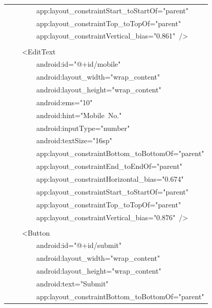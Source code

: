 \documentclass[a4paper,12pt]{article}
\begin{document}
\begin{longtable}{|p{}|}
{\ttfamily\small \ \ \ \ \ \ \ \ app:layout\_constraintStart\_toStartOf="parent"} \\
{\ttfamily\small \ \ \ \ \ \ \ \ app:layout\_constraintTop\_toTopOf="parent"} \\
{\ttfamily\small \ \ \ \ \ \ \ \ app:layout\_constraintVertical\_bias="0.861"\ /\textgreater{}} \\
\strut \\
{\ttfamily\small \ \ \ \ \textless{}EditText} \\
{\ttfamily\small \ \ \ \ \ \ \ \ android:id="@+id/mobile"} \\
{\ttfamily\small \ \ \ \ \ \ \ \ android:layout\_width="wrap\_content"} \\
{\ttfamily\small \ \ \ \ \ \ \ \ android:layout\_height="wrap\_content"} \\
{\ttfamily\small \ \ \ \ \ \ \ \ android:ems="10"} \\
{\ttfamily\small \ \ \ \ \ \ \ \ android:hint="Mobile\ No."} \\
{\ttfamily\small \ \ \ \ \ \ \ \ android:inputType="number"} \\
{\ttfamily\small \ \ \ \ \ \ \ \ android:textSize="16sp"} \\
{\ttfamily\small \ \ \ \ \ \ \ \ app:layout\_constraintBottom\_toBottomOf="parent"} \\
{\ttfamily\small \ \ \ \ \ \ \ \ app:layout\_constraintEnd\_toEndOf="parent"} \\
{\ttfamily\small \ \ \ \ \ \ \ \ app:layout\_constraintHorizontal\_bias="0.674"} \\
{\ttfamily\small \ \ \ \ \ \ \ \ app:layout\_constraintStart\_toStartOf="parent"} \\
{\ttfamily\small \ \ \ \ \ \ \ \ app:layout\_constraintTop\_toTopOf="parent"} \\
{\ttfamily\small \ \ \ \ \ \ \ \ app:layout\_constraintVertical\_bias="0.876"\ /\textgreater{}} \\
\strut \\
{\ttfamily\small \ \ \ \ \textless{}Button} \\
{\ttfamily\small \ \ \ \ \ \ \ \ android:id="@+id/submit"} \\
{\ttfamily\small \ \ \ \ \ \ \ \ android:layout\_width="wrap\_content"} \\
{\ttfamily\small \ \ \ \ \ \ \ \ android:layout\_height="wrap\_content"} \\
{\ttfamily\small \ \ \ \ \ \ \ \ android:text="Submit"} \\
{\ttfamily\small \ \ \ \ \ \ \ \ app:layout\_constraintBottom\_toBottomOf="parent"} \\

\end{longtable}
\end{document}
